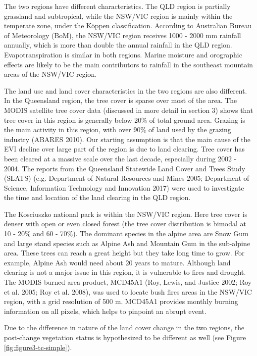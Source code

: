 \documentclass[fleqn,10pt,lineno]{wlpeerj} %
\begin{document}
The two regions have different characteristics. The QLD region is
partially grassland and subtropical, while the NSW/VIC region is mainly
within the temperate zone, under the Köppen classification. According to
Australian Bureau of Meteorology (BoM), the NSW/VIC region receives 1000
- 2000 mm rainfall annually, which is more than double the annual
rainfall in the QLD region. Evapotranspiration is similar in both
regions. Marine moisture and orographic effects are likely to be the
main contributors to rainfall in the southeast mountain areas of the
NSW/VIC region.

The land use and land cover characteristics in the two regions are also
different. In the Queensland region, the tree cover is sparse over most
of the area. The MODIS satellite tree cover data (discussed in more
detail in section 3) shows that tree cover in this region is generally
below 20\% of total ground area. Grazing is the main activity in this
region, with over 90\% of land used by the grazing industry (ABARES
2010). Our starting assumption is that the main cause of the EVI decline
over large part of the region is due to land clearing. Tree cover has
been cleared at a massive scale over the last decade, especially during
2002 - 2004. The reports from the Queensland Statewide Land Cover and
Trees Study (SLATS) (e.g. Department of Natural Resources and Mines
2005; Department of Science, Information Technology and Innovation 2017)
were used to investigate the time and location of the land clearing in
the QLD region.

The Kosciuszko national park is within the NSW/VIC region. Here tree
cover is denser with open or even closed forest (the tree cover
distribution is bimodal at 10 - 20\% and 60 - 70\%). The dominant
species in the alpine area are Snow Gum and large stand species such as
Alpine Ash and Mountain Gum in the sub-alpine area. These trees can
reach a great height but they take long time to grow. For example,
Alpine Ash would need about 20 years to mature. Although land clearing
is not a major issue in this region, it is vulnerable to fires and
drought. The MODIS burned area product, MCD45A1 (Roy, Lewis, and Justice
2002; Roy et al. 2005; Roy et al. 2008), was used to locate bush fires
areas in the NSW/VIC region, with a grid resolution of 500 m. MCD45A1
provides monthly burning information on all pixels, which helps to
pinpoint an abrupt event.

Due to the difference in nature of the land cover change in the two
regions, the post-change vegetation status is hypothesized to be
different as well (see Figure \ref{fig:figure3-tc-simple}).
\end{document}
